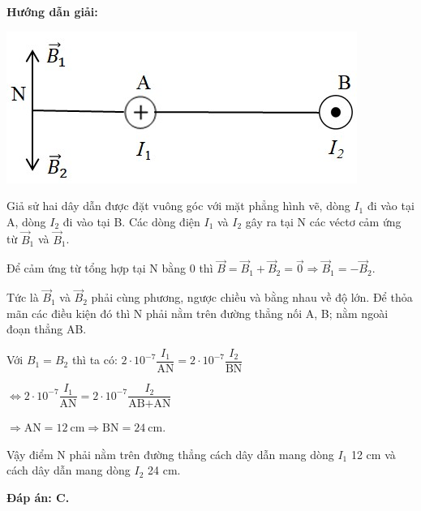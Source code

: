 {	\begin{center}
	\textbf{Hướng dẫn giải:}
\end{center}
	\begin{center}
		\includegraphics[scale=0.8]{../figs/VN11-PH-26-L-018-1-h87.jpg}
	\end{center}
	
	Giả sử hai dây dẫn được đặt vuông góc với mặt phẳng hình vẽ, dòng $I_1$ đi vào tại A, dòng $I_2$  đi vào tại B. Các dòng điện $I_1$ và $I_2$ gây ra tại N các véctơ cảm ứng từ $\vec{B}_1$ và $\vec{B}_1$.
	
	Để cảm ứng từ tổng hợp tại N bằng 0 thì $\vec{B}=\vec{B}_1+\vec{B}_2=\vec{0}\Rightarrow \vec{B}_1=-\vec{B}_2 $. 
	
	
	Tức là $\vec{B}_1$ và $\vec{B}_2$ phải cùng phương, ngược chiều và bằng nhau về độ lớn. Để thỏa mãn các điều kiện đó thì N phải nằm trên đường thẳng nối A, B; nằm ngoài đoạn thẳng AB.
	
	Với $B_1=B_2$ thì ta có:  $2\cdot 10^{-7}\dfrac{I_1}{\text{AN}}=2\cdot 10^{-7}\dfrac{I_2}{\text{BN}}$
	
	$\Leftrightarrow 2\cdot 10^{-7}\dfrac{I_1}{\text{AN}}=2\cdot 10^{-7}\dfrac{I_2}{\text{AB}+\text{AN}}$
	
	$\Rightarrow \text{AN}=\text{12}\ \text{cm}\Rightarrow \text{BN}=\text{24}\ \text{cm}$.
	
	Vậy điểm N phải nằm trên đường thẳng cách dây dẫn mang dòng $I_1$ 12 cm và cách dây dẫn mang dòng $I_2$ 24 cm.
	
\textbf{	Đáp án: C.}
}	


